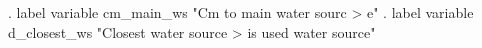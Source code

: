. label variable cm_main_ws "Cm to main water sourc
> e"
{\smallskip}
. label variable d_closest_ws "Closest water source
>  is used water source" 
{\smallskip}
